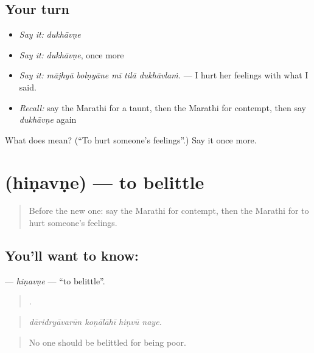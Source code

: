 \subsection*{Your turn}
\begin{itemize}
\raggedright
  \item \emph{Say it:} \emph{dukhāvṇe}
  \item \emph{Say it:} \emph{dukhāvṇe}, once more
  \item \emph{Say it:} \emph{mājhyā bolṇyāne mī tilā dukhāvlaṁ.} — I hurt her feelings with what I said.
  \item \emph{Recall:} say the Marathi for a taunt, then the Marathi for contempt, then say \emph{dukhāvṇe} again
\end{itemize}

\begin{tcolorbox}[breakable,colback=teal!4,colframe=teal!35!black,title={Before you move on}]
What does  mean? (\textquotedblleft{}To hurt someone's feelings\textquotedblright{}.) Say it once more.
\end{tcolorbox}
\section[\texorpdfstring{\mr{हिणवणे} (hiṇavṇe)}{हिणवणे (hiṇavṇe)}]{ (hiṇavṇe) — to belittle}

\label{lesson:MR-C461-hinavne}



\begin{quote}
Before the new one: say the Marathi for contempt, then the Marathi for to hurt someone's feelings.
\end{quote}

\subsection*{You'll want to know: }
\textbf{} — \emph{hiṇavṇe} — \textquotedblleft{}to belittle\textquotedblright{}.

\begin{quote}
   .
\end{quote}

\begin{quote}
\emph{dāridryāvarūn koṇālāhī hiṇvū naye.}
\end{quote}

\begin{quote}
No one should be belittled for being poor.
\end{quote}

